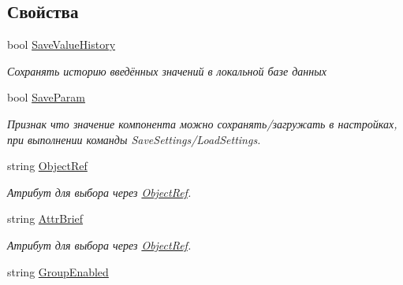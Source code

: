 \subsection*{Свойства}
\begin{DoxyCompactItemize}
\item 
bool \mbox{\hyperlink{class_f_b_a_1_1_date_time_picker_f_b_a_a8ce799d3a20bb7e9ff7efaa1ed706369}{Save\+Value\+History}}
\begin{DoxyCompactList}\small\item\em Сохранять историю введённых значений в локальной базе данных \end{DoxyCompactList}\item 
bool \mbox{\hyperlink{class_f_b_a_1_1_date_time_picker_f_b_a_ade8ff3e60bb1ddd049dff9a432d0730a}{Save\+Param}}
\begin{DoxyCompactList}\small\item\em Признак что значение компонента можно сохранять/загружать в настройках, при выполнении команды Save\+Settings/\+Load\+Settings. \end{DoxyCompactList}\item 
string \mbox{\hyperlink{class_f_b_a_1_1_date_time_picker_f_b_a_ada636905bebb3f709dcdc7950399b0c8}{Object\+Ref}}
\begin{DoxyCompactList}\small\item\em Атрибут для выбора через \mbox{\hyperlink{class_f_b_a_1_1_object_ref}{Object\+Ref}}. ~\newline
\end{DoxyCompactList}\item 
string \mbox{\hyperlink{class_f_b_a_1_1_date_time_picker_f_b_a_a394d819cc42870bec75dcbd99ef7ac0a}{Attr\+Brief}}
\begin{DoxyCompactList}\small\item\em Атрибут для выбора через \mbox{\hyperlink{class_f_b_a_1_1_object_ref}{Object\+Ref}}. ~\newline
\end{DoxyCompactList}\item 
string \mbox{\hyperlink{class_f_b_a_1_1_date_time_picker_f_b_a_aa3546b9ac864c1e20c134a86d1b6ef69}{Group\+Enabled}}

\end{DoxyCompactItemize}
